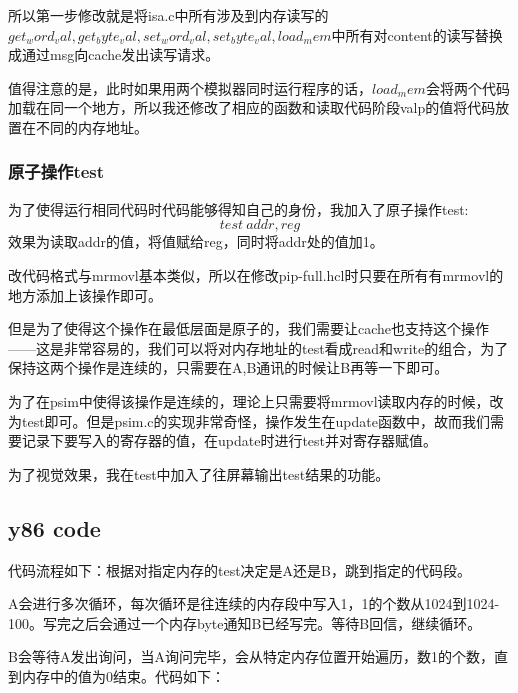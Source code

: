 \documentclass{article}
\theoremstyle{plain} \newtheorem{theorem}{常识}[section]
\theoremstyle{plain} \newtheorem{lizi}{例}[section]
\begin{document}
所以第一步修改就是将isa.c中所有涉及到内存读写的$get_word_val, get_byte_val, set_word_val, set_byte_val, load_mem$中所有对content的读写替换成通过msg向cache发出读写请求。

值得注意的是，此时如果用两个模拟器同时运行程序的话，$load_mem$会将两个代码加载在同一个地方，所以我还修改了相应的函数和读取代码阶段valp的值将代码放置在不同的内存地址。

\subsubsection{原子操作test}
为了使得运行相同代码时代码能够得知自己的身份，我加入了原子操作test:
$$test\ addr,reg$$
效果为读取addr的值，将值赋给reg，同时将addr处的值加1。

改代码格式与mrmovl基本类似，所以在修改pip-full.hcl时只要在所有有mrmovl的地方添加上该操作即可。

但是为了使得这个操作在最低层面是原子的，我们需要让cache也支持这个操作——这是非常容易的，我们可以将对内存地址的test看成read和write的组合，为了保持这两个操作是连续的，只需要在A,B通讯的时候让B再等一下即可。

为了在psim中使得该操作是连续的，理论上只需要将mrmovl读取内存的时候，改为test即可。但是psim.c的实现非常奇怪，操作发生在update函数中，故而我们需要记录下要写入的寄存器的值，在update时进行test并对寄存器赋值。

为了视觉效果，我在test中加入了往屏幕输出test结果的功能。

\subsection{y86 code}

代码流程如下：根据对指定内存的test决定是A还是B，跳到指定的代码段。

A会进行多次循环，每次循环是往连续的内存段中写入1，1的个数从1024到1024-100。写完之后会通过一个内存byte通知B已经写完。等待B回信，继续循环。

B会等待A发出询问，当A询问完毕，会从特定内存位置开始遍历，数1的个数，直到内存中的值为0结束。代码如下：
\end{document}
